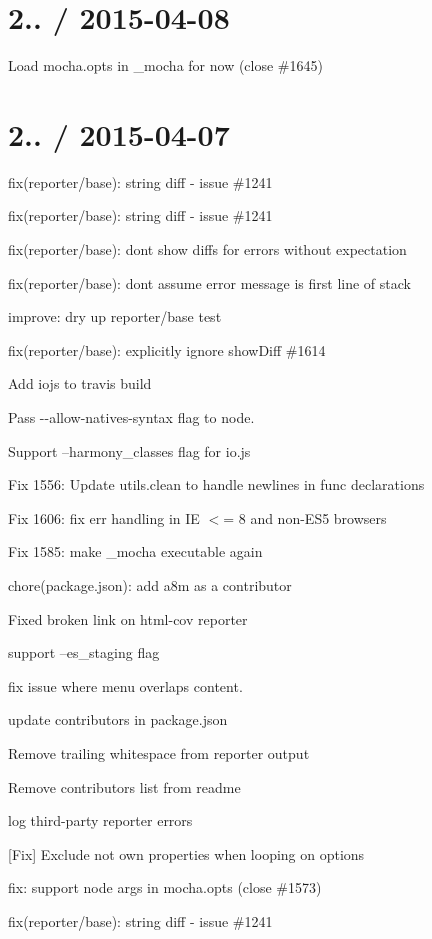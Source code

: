 \section*{2.. / 2015-\/04-\/08}


\begin{DoxyItemize}
\item Load mocha.\+opts in \+\_\+mocha for now (close \#1645)
\end{DoxyItemize}

\section*{2.. / 2015-\/04-\/07}


\begin{DoxyItemize}
\item fix(reporter/base)\+: string diff -\/ issue \#1241
\item fix(reporter/base)\+: string diff -\/ issue \#1241
\item fix(reporter/base)\+: don\textquotesingle{}t show diffs for errors without expectation
\item fix(reporter/base)\+: don\textquotesingle{}t assume error message is first line of stack
\item improve\+: dry up reporter/base test
\item fix(reporter/base)\+: explicitly ignore show\+Diff \#1614
\item Add iojs to travis build
\item Pass {\ttfamily -\/-\/allow-\/natives-\/syntax} flag to node.
\item Support --harmony\+\_\+classes flag for io.\+js
\item Fix 1556\+: Update utils.\+clean to handle newlines in func declarations
\item Fix 1606\+: fix err handling in IE $<$= 8 and non-\/\+E\+S5 browsers
\item Fix 1585\+: make \+\_\+mocha executable again
\item chore(package.\+json)\+: add a8m as a contributor
\item Fixed broken link on html-\/cov reporter
\item support --es\+\_\+staging flag
\item fix issue where menu overlaps content.
\item update contributors in package.\+json
\item Remove trailing whitespace from reporter output
\item Remove contributors list from readme
\item log third-\/party reporter errors
\item \mbox{[}Fix\mbox{]} Exclude not own properties when looping on options
\item fix\+: support node args in mocha.\+opts (close \#1573)
\item fix(reporter/base)\+: string diff -\/ issue \#1241
\end{DoxyItemize}

